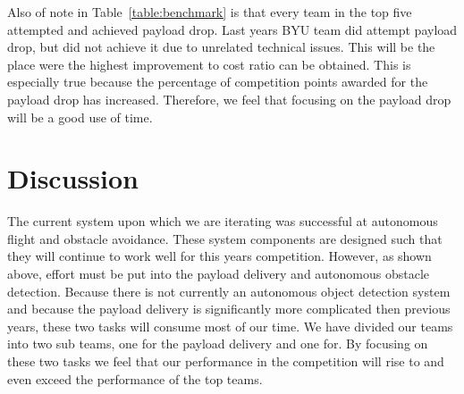 \documentclass[]{auvsi_doc}
\begin{document}
Also of note in Table~\ref{table:benchmark} is that every team in the top five attempted and achieved payload drop. Last years BYU team did attempt payload drop, but did not achieve it due to unrelated technical issues. This will be the place were the highest improvement to cost ratio can be obtained. This is especially true because the percentage of competition points awarded for the payload drop has increased. Therefore, we feel that focusing on the payload drop will be a good use of time.

\section{Discussion}

The current system upon which we are iterating was successful at autonomous flight and obstacle avoidance. These system components are designed such that they will continue to work well for this years competition. However, as shown above, effort must be put into the payload delivery and autonomous obstacle detection. Because there is not currently an autonomous object detection system and because the payload delivery is significantly more complicated then previous years, these two tasks will consume most of our time. We have divided our teams into two sub teams, one for the payload delivery and one for. By focusing on these two tasks we feel that our performance in the competition will rise to and even exceed the performance of the top teams.
\end{document}
